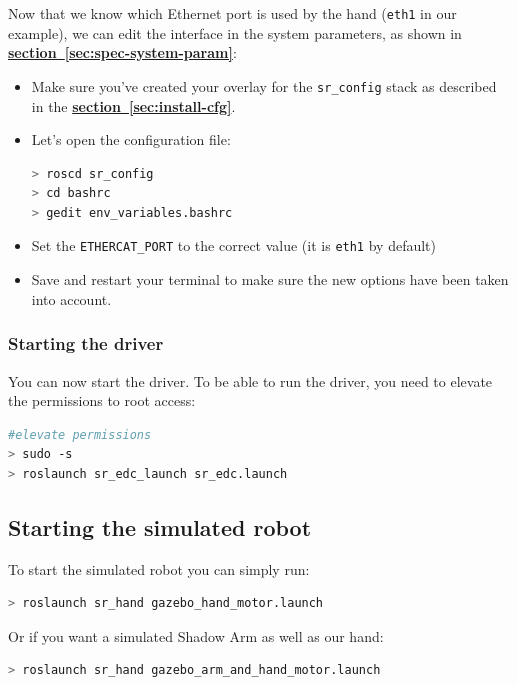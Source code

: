 \documentclass[12pt]{article}
\newcommand{\link}[1]{\hyperref[sec:#1]{\textbf{section~\ref*{sec:#1}}}}
\begin{document}
\par Now that we know which Ethernet port is used by the hand (\texttt{eth1} in our example), we can edit the interface in the system parameters, as shown in \link{spec-system-param}:
\begin{itemize}
\item Make sure you've created your overlay for the \texttt{sr\_config} stack as described in the \link{install-cfg}.
\item Let's open the configuration file:
  \begin{lstlisting}[escapeinside='', language=Bash]
> roscd sr_config
> cd bashrc
> gedit env_variables.bashrc
  \end{lstlisting}
\item Set the \texttt{ETHERCAT\_PORT} to the correct value (it is \texttt{eth1} by default)
\item Save and restart your terminal to make sure the new options have been taken into account.
\end{itemize}

\subsubsection{Starting the driver}
\par You can now start the driver. To be able to run the driver, you need to elevate the permissions to root access:
  \begin{lstlisting}[escapeinside='', language=Bash]
#elevate permissions
> sudo -s
> roslaunch sr_edc_launch sr_edc.launch
  \end{lstlisting}

\subsection{Starting the simulated robot}
\label{sec:start-simul-hand}
\par To start the simulated robot you can simply run:
  \begin{lstlisting}[escapeinside='', language=Bash]
> roslaunch sr_hand gazebo_hand_motor.launch
  \end{lstlisting}

\par Or if you want a simulated Shadow Arm as well as our hand:
  \begin{lstlisting}[escapeinside='', language=Bash]
> roslaunch sr_hand gazebo_arm_and_hand_motor.launch
  \end{lstlisting}
\end{document}
